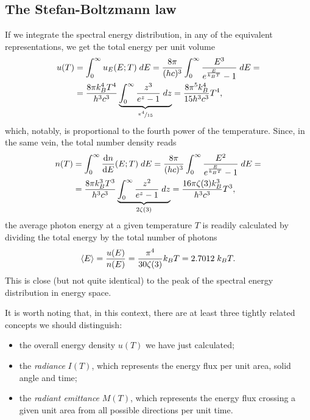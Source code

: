 \subsection{The Stefan-Boltzmann law}
\label{sec:stefan_boltzmann_law}

If we integrate the spectral energy distribution, in any of the equivalent representations,
we get the total energy per unit volume
\begin{align}
  u(T) & = \int_0^\infty u_E(E; T)\;d{E} =
  \frac{8\pi}{(hc)^3} \int_0^\infty \frac{E^3}{e^\frac{E}{k_B T} - 1} \;d{E} =\\\nonumber
  & = \frac{8\pi k_B^4 T^4}{h^3 c^3}
  \underbrace{\int_0^\infty \frac{z^3}{e^z - 1} \;d{z}}_{\nicefrac{\pi^4}{15}} =
  \frac{8\pi^5 k_B^4}{15 h^3 c^3} T^4,
\end{align}
which, notably, is proportional to the fourth power of the temperature. Since, in
the same vein, the total number density reads
\begin{align}
  n(T) & = \int_0^\infty \dv{n}{E}{(E; T)}\;d{E} =
  \frac{8\pi}{(hc)^3} \int_0^\infty \frac{E^2}{e^\frac{E}{k_B T} - 1} \;d{E} =\\\nonumber
  & = \frac{8\pi k_B^3 T^3}{h^3 c^3}
  \underbrace{\int_0^\infty \frac{z^2}{e^z - 1} \;d{z}}_{2 \zeta(3)} =
  \frac{16\pi \zeta(3) k_B^3}{h^3 c^3} T^3,
\end{align}
the average photon energy at a given temperature $T$ is readily calculated by
dividing the total energy by the total number of photons
\begin{align}
  \left<E\right> = \frac{u(E)}{n(E)} = \frac{\pi^4}{30 \zeta(3)} k_B T = 2.7012 \; k_B T.
\end{align}
This is close (but not quite identical) to the peak of the spectral energy distribution
in energy space.

It is worth noting that, in this context, there are at least three tightly related
concepts we should distinguish:
\begin{itemize}
  \item the overall energy density $u(T)$ we have just calculated;
  \item the \emph{radiance} $I(T)$, which represents the energy flux per unit area,
    solid angle and time;
  \item the \emph{radiant emittance} $M(T)$, which represents the energy flux crossing
    a given unit area from all possible directions per unit time.
\end{itemize}

